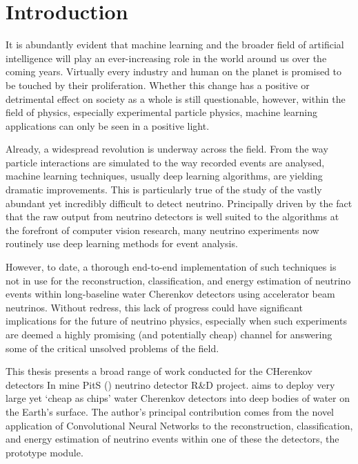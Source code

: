 \chapter{Introduction} %
\label{chap:introduction} %
\setcounter{page}{17}  %

It is abundantly evident that machine learning and the broader field of artificial intelligence
will play an ever-increasing role in the world around us over the coming years. Virtually every
industry and human on the planet is promised to be touched by their proliferation. Whether this
change has a positive or detrimental effect on society as a whole is still questionable, however,
within the field of physics, especially experimental particle physics, machine learning
applications can only be seen in a positive light.

Already, a widespread revolution is underway across the field. From the way particle interactions
are simulated to the way recorded events are analysed, machine learning techniques, usually deep
learning algorithms, are yielding dramatic improvements. This is particularly true of the study of
the vastly abundant yet incredibly difficult to detect neutrino. Principally driven by the fact
that the raw output from neutrino detectors is well suited to the algorithms at the forefront of
computer vision research, many neutrino experiments now routinely use deep learning methods for
event analysis.

However, to date, a thorough end-to-end implementation of such techniques is not in use for the
reconstruction, classification, and energy estimation of neutrino events within long-baseline
water Cherenkov detectors using accelerator beam neutrinos. Without redress, this lack of progress
could have significant implications for the future of neutrino physics, especially when such
experiments are deemed a highly promising (and potentially cheap) channel for answering some of
the critical unsolved problems of the field.

This thesis presents a broad range of work conducted for the CHerenkov detectors In mine PitS
(\chips) neutrino detector R\&D project. \chips aims to deploy very large yet `cheap as chips'
water Cherenkov detectors into deep bodies of water on the Earth's surface. The author's principal
contribution comes from the novel application of Convolutional Neural Networks to the
reconstruction, classification, and energy estimation of neutrino events within one of these the
detectors, the \chipsfive prototype module.

